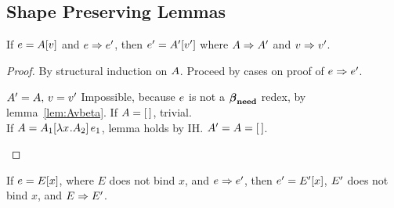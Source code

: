 \documentclass{article}
\begin{document}




%
%

\subsection{Shape Preserving Lemmas}

\begin{lemma}
\label{lem:Av}
If $\e = \Av$ and $\e \pstep \e'$, then $\e' = \inA[']{\val'}$ where $\A \pstep
\A'$ and $\val \pstep \val'$.
\end{lemma}

\begin{proof}
By structural induction on $\A$. Proceed by cases on proof of $\e \pstep
\e'$.
\begin{byCases}
   $\A' = \A,\,\val = \val'$
  Impossible, because $\e$ is not a $\betaneednr$ redex, by 
  lemma~\ref{lem:Avbeta}.
  If $\A = \hole$, trivial. \\
  If $\A = \ap{\inA[_1]{\lx\A_2}}{\e_1}$,
  lemma holds by IH.
    $\A' = \A = \hole$.
\end{byCases}
\end{proof}


\begin{lemma}
\label{lem:Ex}
If $\e = \Ex$, where $E$ does not bind $x$, and $\e \pstep \e'$, then $\e' =
\Ex[']$, $\E'$ does not bind $x$, and $\E \pstep \E'$.
\end{lemma}
\end{document}
